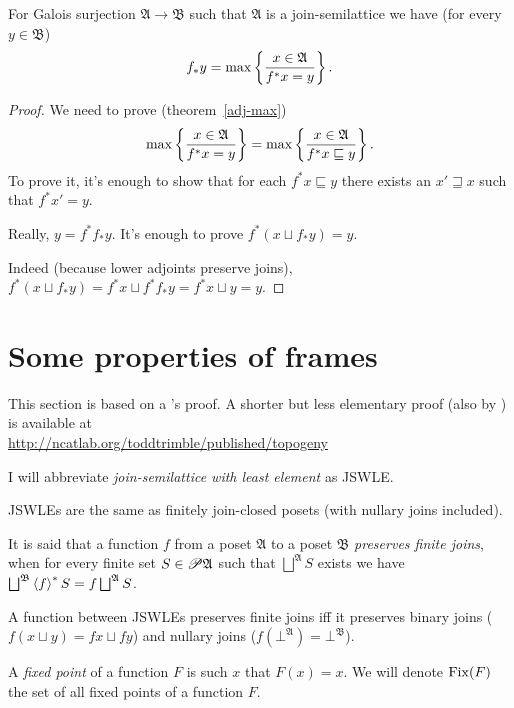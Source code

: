 \begin{prop}\label{gal-eq}
  For Galois surjection $\mathfrak{A} \rightarrow \mathfrak{B}$ such that
  $\mathfrak{A}$ is a join-semilattice we have (for every $y \in
  \mathfrak{B}$)
  \[ f_{\ast} y = \max \left\{ \frac{ x \in \mathfrak{A} }{
     f^{\ast} x = y }\right\} . \]
\end{prop}

\begin{proof}
  We need to prove (theorem~\ref{adj-max})
  \[ \max \left\{ \frac{ x \in \mathfrak{A} }{ f^{\ast} x = y }\right\} =
     \max \left\{ \frac{ x \in \mathfrak{A} }{ f^{\ast} x \sqsubseteq y }\right\} . \]
  To prove it, it's enough to show that for each $f^{\ast} x \sqsubseteq y$
  there exists an $x' \sqsupseteq x$ such that $f^{\ast} x' = y$.
  
  Really, $y = f^{\ast} f_{\ast} y$. It's enough to prove $f^{\ast} (x \sqcup
  f_{\ast} y) = y$.
  
  Indeed (because lower adjoints preserve joins),
  $f^{\ast} (x \sqcup f_{\ast} y) = f^{\ast} x \sqcup f^{\ast} f_{\ast} y = f^{\ast} x \sqcup y = y$.
\end{proof}

\section{Some properties of frames}\label{some-frames}

This section is based on a 's proof. A shorter
but less elementary proof (also by ) is available
at\\
\href{http://ncatlab.org/toddtrimble/published/topogeny}{http://ncatlab.org/toddtrimble/published/topogeny}

I will abbreviate \emph{join-semilattice with least element} as JSWLE.
\begin{obvious}
JSWLEs are the same as finitely join-closed posets (with nullary joins
included).
\end{obvious}

\begin{defn}
It is said that a function $f$ from a poset $\mathfrak{A}$ to a
poset $\mathfrak{B}$ \emph{preserves finite joins}, when for every
finite set $S\in\mathscr{P}\mathfrak{A}$ such that $\bigsqcup^{\mathfrak{A}}S$
exists we have $\bigsqcup^{\mathfrak{B}}\supfun f^{\ast}S=f\bigsqcup^{\mathfrak{A}}S$.\end{defn}
\begin{obvious}
A function between JSWLEs preserves finite joins iff it preserves
binary joins ($f(x\sqcup y)=fx\sqcup fy$) and nullary joins ($f(\bot^{\mathfrak{A}})=\bot^{\mathfrak{B}}$).\end{obvious}
\begin{defn}
A \emph{fixed point} of a function $F$ is such $x$ that $F(x)=x$.
We will denote $\operatorname{Fix}(F)$ the set of all fixed points of a function
$F$.
\end{defn}

